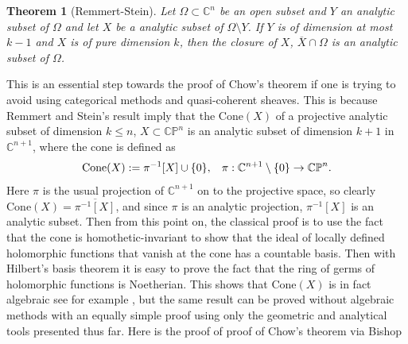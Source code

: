 \documentclass[12pt,twoside,a4paper]{report}
\newtheorem{theorem}{Theorem}[section]
\newcommand{\co}{\ensuremath{\mathbb C }}
\newcommand{\con}{\ensuremath{\mathbb{C}^n}}
\newcommand{\cp}{\ensuremath{\mathbb{CP}}}
\newcommand{\om}{\ensuremath{\Omega}}
\begin{document}
  \begin{theorem}[Remmert-Stein]\label{Rem-Stein}
          Let $\om\subset\con$ be an open subset and $Y$ an analytic subset of $\om$ and let $X$ be a analytic subset of $\om\setminus Y$. If $Y$ is of dimension at most $k-1$ and $X$ is of pure dimension $k$, then the closure of $X$, $\overline{X}\cap\om$ is an analytic subset of $\om$.
  \end{theorem}
  This is an essential step towards the proof of Chow's theorem if one is trying to avoid using categorical methods and
  quasi-coherent sheaves. This is because Remmert and Stein's result imply that the $\textrm{Cone}(X)$ of a projective analytic
  subset of dimension $k\leq n$, $X\subset\cp^n$ is an analytic subset of dimension $k+1$ in $\co^{n+1}$, where the cone is defined as
  \begin{equation}
  \textrm{Cone}(X):=\pi^{-1}[X]\cup\lbrace0\rbrace,\hspace{0.3cm}\pi:\co^{n+1}\setminus\lbrace 0\rbrace\rightarrow\cp^n.
  \end{equation}
  \noindent Here $\pi$ is the usual projection of $\co^{n+1}$ on to the
  projective space, so clearly $\textrm{Cone}(X)=\overline{\pi^{-1}[X]}$, and since $\pi$
  is an analytic projection, $\pi^{-1}[X]$ is an analytic subset. Then from this
  point on, the classical proof is to use the fact that the cone is homothetic-invariant to
  show that the ideal of locally defined holomorphic functions that vanish at the
  cone has a countable basis. Then with Hilbert's basis theorem it is easy to prove the
  fact that the ring of germs of holomorphic functions is Noetherian. This shows
  that $\textrm{Cone}(X)$ is in fact algebraic see for example \cite{Chirka}, but the same result can
  be proved without algebraic methods with an equally simple proof using only
  the geometric and analytical tools presented thus far.  Here is the proof of proof of Chow's theorem via Bishop
\end{document}

